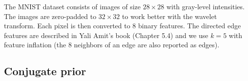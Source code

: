 \documentclass{report}
\begin{document}
The MNIST dataset consists of images of size $28 \times 28$ with gray-level intensities. The images are zero-padded to $32 \times 32$ to work better with the wavelet transform. Each pixel is then converted to 8 binary features. The directed edge features are described in Yali Amit's book (Chapter 5.4) and we use $k=5$ with feature inflation (the 8 neighbors of an edge are also reported as edges).

\subsection{Conjugate prior}


\end{document}
